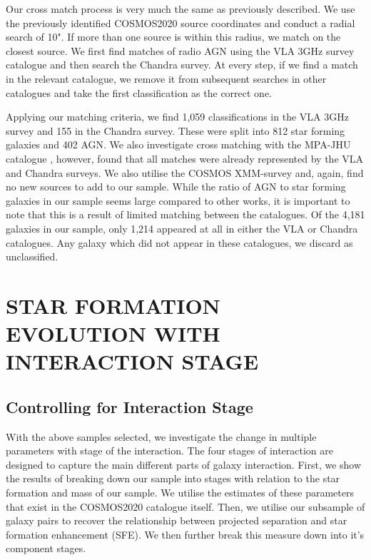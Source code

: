 Our cross match process is very much the same as previously described. We use the previously identified COSMOS2020 source coordinates and conduct a radial search of 10". If more than one source is within this radius, we match on the closest source. We first find matches of radio AGN using the VLA 3GHz survey catalogue and then search the Chandra survey. At every step, if we find a match in the relevant catalogue, we remove it from subsequent searches in other catalogues and take the first classification as the correct one.

Applying our matching criteria, we find 1,059 classifications in the VLA 3GHz survey and 155 in the Chandra survey. These were split into 812 star forming galaxies and 402 AGN. We also investigate cross matching with the MPA-JHU catalogue \citep{2003MNRAS.341...33K, 2004MNRAS.351.1151B, 2007ApJS..173..267S}, however, found that all matches were already represented by the VLA and Chandra surveys. We also utilise the COSMOS XMM-survey and, again, find no new sources to add to our sample. While the ratio of AGN to star forming galaxies in our sample seems large compared to other works, it is important to note that this is a result of limited matching between the catalogues. Of the 4,181 galaxies in our sample, only 1,214 appeared at all in either the VLA or Chandra catalogues. Any galaxy which did not appear in these catalogues, we discard as unclassified. 

\section{STAR FORMATION EVOLUTION WITH INTERACTION STAGE}\label{results:SF_stage}
\subsection{Controlling for Interaction Stage}
\noindent With the above samples selected, we investigate the change in multiple parameters with stage of the interaction. The four stages of interaction are designed to capture the main different parts of galaxy interaction. First, we show the results of breaking down our sample into stages with relation to the star formation and mass of our sample. We utilise the estimates of these parameters that exist in the COSMOS2020 catalogue itself. Then, we utilise our subsample of galaxy pairs to recover the relationship between projected separation and star formation enhancement (SFE). We then further break this measure down into it's component stages.


